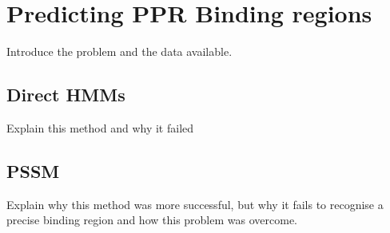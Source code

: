 \section{Predicting PPR Binding regions}
\label{sec:ppr_binding_prediction}

Introduce the problem and the data available.

\subsection{Direct HMMs}
\label{sec:hmm_binding}

Explain this method and why it failed

\subsection{PSSM}
\label{sec:pssm_binding}

Explain why this method was more successful, but why it fails to recognise a
precise binding region and how this problem was overcome.


